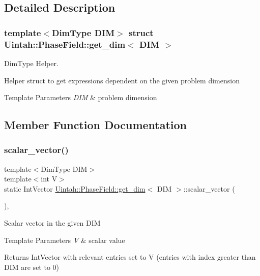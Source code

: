\subsection{Detailed Description}
\subsubsection*{template$<$Dim\+Type D\+IM$>$\newline
struct Uintah\+::\+Phase\+Field\+::get\+\_\+dim$<$ D\+I\+M $>$}

Dim\+Type Helper. 

Helper struct to get expressions dependent on the given problem dimension 
\begin{DoxyTemplParams}{Template Parameters}
{\em D\+IM} & problem dimension \\
\hline
\end{DoxyTemplParams}


\subsection{Member Function Documentation}
\mbox{\label{structUintah_1_1PhaseField_1_1get__dim_a23acb158beb7f5bc2092b0162ffdcf2a}} 
\subsubsection{\texorpdfstring{scalar\+\_\+vector()}{scalar\_vector()}}
{\footnotesize\ttfamily template$<$Dim\+Type D\+IM$>$ \\
template$<$int V$>$ \\
static Int\+Vector \hyperlink{structUintah_1_1PhaseField_1_1get__dim}{Uintah\+::\+Phase\+Field\+::get\+\_\+dim}$<$ D\+IM $>$\+::scalar\+\_\+vector (\begin{DoxyParamCaption}{ }\end{DoxyParamCaption})\hspace{0.3cm}{\ttfamily [inline]}, {\ttfamily [static]}}

Scalar vector in the given D\+IM 
\begin{DoxyTemplParams}{Template Parameters}
{\em V} & scalar value \\
\hline
\end{DoxyTemplParams}
\begin{DoxyReturn}{Returns}
Int\+Vector with relevant entries set to V (entries with index greater than D\+IM are set to 0) 
\end{DoxyReturn}
\mbox{\label{structUintah_1_1PhaseField_1_1get__dim_adf79b3a3a658519c8516b6899fb9d588}} 

